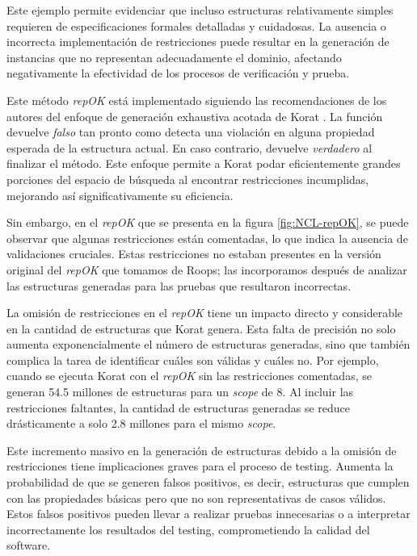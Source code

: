 Este ejemplo permite evidenciar que incluso estructuras relativamente simples requieren de especificaciones formales 
detalladas y cuidadosas. La ausencia o incorrecta implementación de restricciones puede resultar en la 
generación de instancias que no representan adecuadamente el dominio, afectando negativamente la efectividad de los 
procesos de verificación y prueba.


Este método \emph{repOK} está implementado siguiendo las recomendaciones de los
autores del enfoque de generación exhaustiva acotada de \textsf{Korat} \cite{Boyapati02}. 
La función devuelve \emph{falso} tan pronto como detecta una violación en alguna propiedad esperada de la estructura actual. 
En caso contrario, devuelve \emph{verdadero} al finalizar el método. 
Este enfoque permite a \textsf{Korat} podar eficientemente grandes porciones del espacio de búsqueda al encontrar restricciones incumplidas, mejorando así significativamente su eficiencia.

Sin embargo, en el \emph{repOK} que se presenta en la figura \ref{fig:NCL-repOK}, 
se puede observar que algunas restricciones están comentadas, 
lo que indica la ausencia de validaciones cruciales. 
Estas restricciones no estaban presentes en la versión original del \emph{repOK} que tomamos de Roops; 
las incorporamos después de analizar las estructuras generadas para las pruebas que resultaron incorrectas.

La omisión de restricciones en el \emph{repOK} tiene un impacto directo y considerable en la cantidad de estructuras que \textsf{Korat} genera. 
Esta falta de precisión no solo aumenta exponencialmente el número de estructuras generadas, 
sino que también complica la tarea de identificar cuáles son válidas y cuáles no. 
Por ejemplo, cuando se ejecuta \textsf{Korat} con el \emph{repOK} sin las restricciones comentadas, 
se generan 54.5 millones de estructuras para un \emph{scope} de 8. Al incluir las restricciones faltantes, 
la cantidad de estructuras generadas se reduce drásticamente a solo 2.8 millones para el mismo \emph{scope}.

Este incremento masivo en la generación de estructuras debido a la omisión de restricciones tiene implicaciones graves para el proceso de testing. 
Aumenta la probabilidad de que se generen falsos positivos, es decir, estructuras que cumplen con las propiedades básicas pero que no son representativas de casos válidos. 
Estos falsos positivos pueden llevar a realizar pruebas innecesarias o a interpretar incorrectamente los resultados del testing, comprometiendo la calidad del software.


